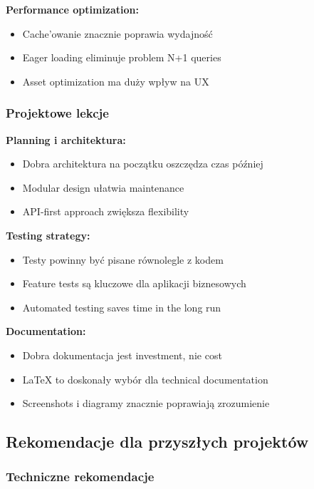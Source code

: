 \documentclass[12pt,a4paper]{article}
\begin{document}
    \textbf{Performance optimization:}
    \begin{itemize}
        \item Cache'owanie znacznie poprawia wydajność
        \item Eager loading eliminuje problem N+1 queries
        \item Asset optimization ma duży wpływ na UX
    \end{itemize}

    \subsubsection{Projektowe lekcje}

    \textbf{Planning i architektura:}
    \begin{itemize}
        \item Dobra architektura na początku oszczędza czas później
        \item Modular design ułatwia maintenance
        \item API-first approach zwiększa flexibility
    \end{itemize}

    \textbf{Testing strategy:}
    \begin{itemize}
        \item Testy powinny być pisane równolegle z kodem
        \item Feature tests są kluczowe dla aplikacji biznesowych
        \item Automated testing saves time in the long run
    \end{itemize}

    \textbf{Documentation:}
    \begin{itemize}
        \item Dobra dokumentacja jest investment, nie cost
        \item LaTeX to doskonały wybór dla technical documentation
        \item Screenshots i diagramy znacznie poprawiają zrozumienie
    \end{itemize}

    \subsection{Rekomendacje dla przyszłych projektów}

    \subsubsection{Techniczne rekomendacje}
\end{document}
